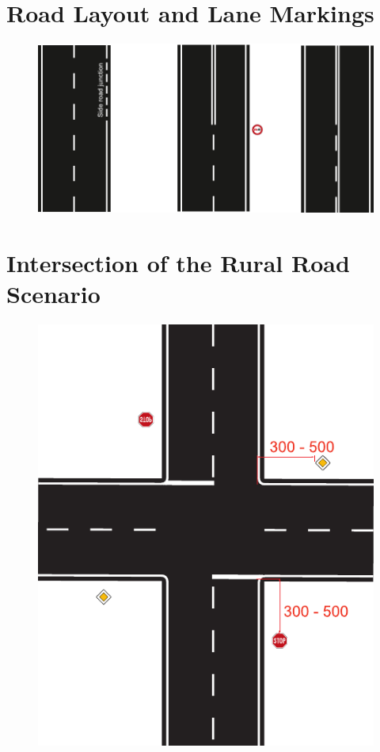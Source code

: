 \section{Road Layout and Lane Markings}
\label{fig_road_layout}
\begin{figure}[H]
	\begin{center}
		\centering\includegraphics[]{graphics/Abb_4_road_layout.pdf}
	\end{center}
\end{figure}

\section{Intersection of the Rural Road Scenario}
\label{fig_intersection_rural}
\begin{figure}[H]
	\begin{center}
		\centering\includegraphics[]{graphics/Abb_5_intersection.pdf}
	\end{center}
\end{figure}

